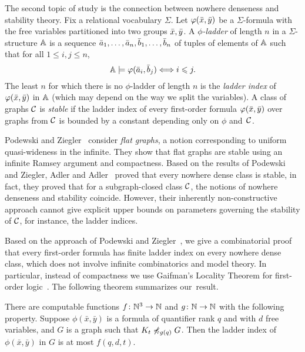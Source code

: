 The second topic of study is the
connection between nowhere denseness and stability theory. 
Fix
 a relational vocabulary $\Sigma$. Let 
$\varphi(\bar{x},\bar{y})$ be a $\Sigma$-formula with the free variables
partitioned into two groups $\bar{x}, \bar{y}$. A \emph{$\phi$-ladder}
of length $n$ in a $\Sigma$-structure $\mathbb A$ is a sequence $\bar{a}_1,\ldots, \bar{a}_{n},
\bar{b}_1,\ldots, \bar{b}_{n}$ of tuples of elements of $\mathbb A$ 
such that for all $1\leq i,j\le n$,
\[\mathbb{A}\models\varphi(\bar{a}_i,\bar{b}_j)\Longleftrightarrow i\leqslant j. \]
The least  $n$ for which 
there is no $\phi$-ladder of length $n$ is 
the \emph{ladder index} 
of $\varphi(\bar{x},\bar{y})$ in $\mathbb A$ (which may depend on the way we split the
variables). A class of graphs $\mathcal{C}$ is \emph{stable} if
the ladder index of every first-order formula $\varphi(\bar{x},\bar{y})$ over
graphs from $\mathcal{C}$ is bounded by a constant depending only on $\phi$ 
and~$\mathcal{C}$. 

Podewski and Ziegler~\cite{podewski1978stable} 
consider \emph{flat graphs}, a notion corresponding to uniform quasi-wideness in the 
infinite. They show that flat graphs are stable using an 
infinite Ramsey argument and compactness. Based on the 
results of Podewski and Ziegler, 
Adler and Adler~\cite{adler2014interpreting}
proved that every nowhere dense class is stable, in fact, they 
proved that for a subgraph-closed class $\mathcal{C}$, the notions of 
nowhere denseness and stability coincide.
However, their inherently non-constructive approach cannot give explicit upper bounds on parameters governing the stability of $\mathcal{C}$, for instance, the ladder indices.

Based on the approach of Podewski and Ziegler~\cite{podewski1978stable}, we give a combinatorial 
proof that every first-order formula has finite ladder index on every
nowhere dense class, which does not involve infinite combinatorics and model theory.
In particular, instead of compactness we use Gaifman's Locality Theorem for
first-order logic~\cite{gaifman1982local}. The following theorem summarizes our~result.

\begin{theorem}\label{thm:new-stable}
  There are computable functions $f\colon \mathbb{N}^3\to\mathbb{N}$ and $g\colon\mathbb{N}\to\mathbb{N}$ with the following property.
Suppose $\phi(\bar x,\bar y)$ is a formula of quantifier rank $q$ and with $d$ free variables,
and $G$ is a graph such that $K_t\not\preccurlyeq_{g(q)} G$. Then the ladder index of $\phi(\bar x,\bar y)$ in $G$ is at most $f(q,d,t)$.
\end{theorem}

